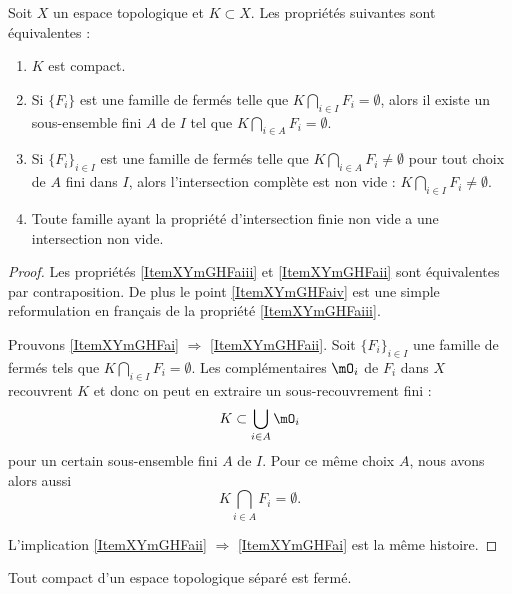 \begin{proposition}\label{PropXKUMiCj}
    Soit \( X\) un espace topologique et \( K\subset X\). Les propriétés suivantes sont équivalentes :
    \begin{enumerate}
        \item\label{ItemXYmGHFai}
            \( K\) est compact.
        \item\label{ItemXYmGHFaii}
            Si \( \{ F_i \}\) est une famille de fermés telle que \( K\bigcap_{i\in I}F_i=\emptyset\), alors il existe un sous-ensemble fini \( A\) de \( I\) tel que \( K\bigcap_{i\in A}F_i=\emptyset\).
        \item\label{ItemXYmGHFaiii}
            Si \( \{ F_i \}_{i\in I}\) est une famille de fermés telle que \( K\bigcap_{i\in A}F_i\neq\emptyset\) pour tout choix de \( A\) fini dans \( I\), alors l'intersection complète est non vide : \( K\bigcap_{i\in I}F_i\neq\emptyset\).
        \item\label{ItemXYmGHFaiv}
            Toute famille ayant la propriété d'intersection finie non vide a une intersection non vide.
    \end{enumerate}
\end{proposition}

\begin{proof}
    Les propriétés \ref{ItemXYmGHFaiii} et \ref{ItemXYmGHFaii} sont équivalentes par contraposition. De plus le point \ref{ItemXYmGHFaiv} est une simple reformulation en français de la propriété \ref{ItemXYmGHFaiii}.

    Prouvons \ref{ItemXYmGHFai} \( \Rightarrow\) \ref{ItemXYmGHFaii}. Soit \( \{ F_i \}_{i\in I}\) une famille de fermés tels que \( K\bigcap_{i\in I}F_i=\emptyset\). Les complémentaires \( \mO_i\) de \( F_i\) dans \( X\) recouvrent \( K\) et donc on peut en extraire un sous-recouvrement fini :
    \begin{equation}
        K\subset\bigcup_{i\in A}\mO_i
    \end{equation}
    pour un certain sous-ensemble fini \( A\) de \( I\). Pour ce même choix \( A\), nous avons alors aussi
    \begin{equation}
        K\bigcap_{i\in A}F_i=\emptyset.
    \end{equation}

    L'implication \ref{ItemXYmGHFaii} \( \Rightarrow\) \ref{ItemXYmGHFai} est la même histoire.
\end{proof}

\begin{proposition}\label{PropUCUknHx}
    Tout compact d'un espace topologique séparé est fermé.
\end{proposition}

